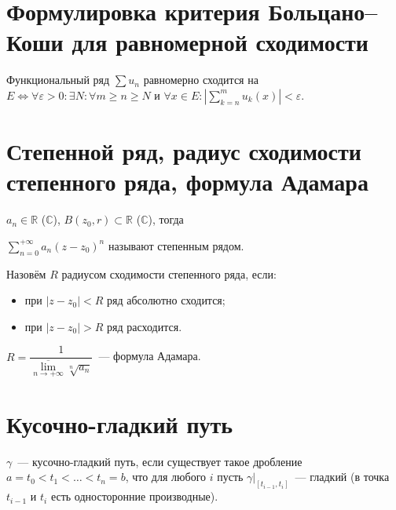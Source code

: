 \documentclass{article}
\begin{document}
    \newpage
    
    \section{Формулировка критерия Больцано--Коши для равномерной сходимости}
    
        Функциональный ряд $\sum u_n$ равномерно сходится на $E \Longleftrightarrow \forall \varepsilon > 0 : \exists N : \forall m \geq n \geq N$ и $\forall x \in E : \left| \sum\limits^m_{k = n} u_k(x) \right| < \varepsilon$.
        
    \newpage
    
    \section{Степенной ряд, радиус сходимости степенного ряда, формула Адамара}
    
        $a_n \in \mathbb{R}$ ($\mathbb{C}$), $B(z_0, r) \subset \mathbb{R}$ ($\mathbb{C}$), тогда
        
        $\sum\limits^{+\infty}_{n = 0} a_n (z - z_0)^n$ называют степенным рядом.
        
        Назовём $R$ радиусом сходимости степенного ряда, если:
        
            \begin{itemize}
            
                \item при $|z - z_0| < R$ ряд абсолютно сходится;
                
                \item при $|z - z_0| > R$ ряд расходится.
                
            \end{itemize}
        
        $R = \dfrac{1}{\overline{\lim\limits_{n \rightarrow +\infty}} \sqrt[n]{a_n}}$~--- формула Адамара.
    
    \newpage
    
    \section{Кусочно-гладкий путь}
    
        $\gamma$~--- кусочно-гладкий путь, если существует такое дробление $a = t_0 < t_1 < \ldots < t_n = b$, что для любого $i$ пусть $\gamma \big|_{[t_{i - 1}, t_i]}$~--- гладкий (в точка $t_{i - 1}$ и $t_i$ есть односторонние производные).
        
\end{document}
